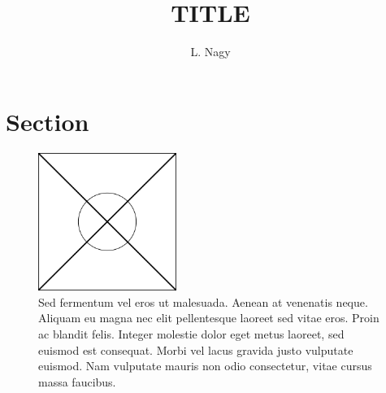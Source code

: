 

\title{TITLE}
\author{L. Nagy}
\date{}



\maketitle

\begin{abstract}
    \noindent\lipsum[1]
\end{abstract}

\section*{Section}

\lipsum

\begin{figure}[h!]
  \centering
  \includegraphics[width=0.4\textwidth]{figures/figure1}
  \caption{Sed fermentum vel eros ut malesuada. Aenean at venenatis neque. 
           Aliquam eu magna nec elit pellentesque laoreet sed vitae eros. 
           Proin ac blandit felis. Integer molestie dolor eget metus laoreet, 
           sed euismod est consequat. Morbi vel lacus gravida justo vulputate 
           euismod. Nam vulputate mauris non odio consectetur, vitae cursus 
           massa faucibus.}
  \label{fig:function1}
\end{figure}

\lipsum \cite{texbook}



\lipsum[1] \cite{latex:companion}

